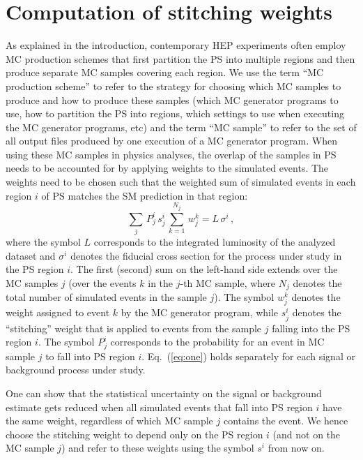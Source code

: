 \section{Computation of stitching weights}
\label{sec:stitching_weights}

As explained in the introduction,
contemporary HEP experiments often employ MC production schemes
that first partition the PS into multiple regions and then produce separate MC samples covering each region.
We use the term ``MC production scheme'' to refer to the strategy for choosing which MC samples to produce and how to produce these samples 
(which MC generator programs to use, how to partition the PS into regions, which settings to use when executing the MC generator programs, etc)
and the term ``MC sample'' to refer to the set of all output files produced by one execution of a MC generator program.
When using these MC samples in physics analyses,
the overlap of the samples in PS needs to be accounted for by applying weights to the simulated events.
The weights need to be chosen such that the weighted sum of simulated events in each region $i$ of PS 
matches the SM prediction in that region:
\begin{equation}
\sum_{j} \, P_{j}^{i} \, s_{j}^{i} \, \sum_{k=1}^{N_{j}} \, w_{j}^{k} = L \, \sigma^{i} \, ,
\label{eq:one}
\end{equation}
where the symbol $L$ corresponds to the integrated luminosity of the analyzed dataset
and $\sigma^{i}$ denotes the fiducial cross section for the process under study in the PS region $i$.
The first (second) sum on the left-hand side extends over the MC samples $j$ 
(over the events $k$ in the $j$-th MC sample, where $N_{j}$ denotes the total number of simulated events in the sample $j$).
The symbol $w_{j}^{k}$ denotes the weight assigned to event $k$ by the MC generator program,
while $s_{j}^{i}$ denotes the ``stitching'' weight that is applied to events from the sample $j$ falling into the PS region $i$.
The symbol $P_{j}^{i}$ corresponds to the probability for an event in MC sample $j$ to fall into PS region $i$.
Eq.~(\ref{eq:one}) holds separately for each signal or background process under study.

One can show that the statistical uncertainty on the signal or background estimate
gets reduced when all simulated events that fall into PS region $i$ have the same weight,
regardless of which MC sample $j$ contains the event.
We hence choose the stitching weight to depend only on the PS region $i$ (and not on the MC sample $j$)
and refer to these weights using the symbol $s^{i}$ from now on.

